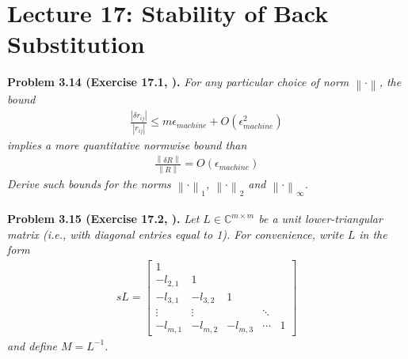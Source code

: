 \documentclass[a4paper,oneside]{book}
\numberwithin{equation}{chapter}
\begin{document}
\section{Lecture 17: Stability of Back Substitution}
\textbf{Problem 3.14 (Exercise 17.1, \cite{1}).} \textit{For any particular choice of norm $\left\|  \cdot  \right\|$, the bound}
\begin{align}
\frac{{\left| {\delta {r_{ij}}} \right|}}{{\left| {{r_{ij}}} \right|}} \le m{\epsilon _{machine}} + O\left( {\epsilon _{machine}^2} \right)
\end{align}
\textit{implies a more quantitative normwise bound than}
\begin{align}
\frac{{\left\| {\delta R} \right\|}}{{\left\| R \right\|}} = O\left( {{\epsilon _{machine}}} \right)
\end{align}
\textit{Derive such bounds for the norms ${\left\|  \cdot  \right\|_1}$, ${\left\|  \cdot  \right\|_2}$ and ${\left\|  \cdot  \right\|_\infty}$.}\\
\\
\textbf{Problem 3.15 (Exercise 17.2, \cite{1}).}  \textit{Let $L\in \mathbb{C}^{m\times m}$ be a unit lower-triangular matrix (i.e., with diagonal entries equal to 1). For convenience, write $L$ in the form}
\begin{align}
sL = \left[ {\begin{array}{*{20}{c}}
1&{}&{}&{}&{}\\
{ - {l_{2,1}}}&1&{}&{}&{}\\
{ - {l_{3,1}}}&{ - {l_{3,2}}}&1&{}&{}\\
 \vdots & \vdots &{}& \ddots &{}\\
{ - {l_{m,1}}}&{ - {l_{m,2}}}&{ - {l_{m,3}}}& \cdots &1
\end{array}} \right]
\end{align}
\textit{and define $M=L^{-1}$.}
\end{document}
